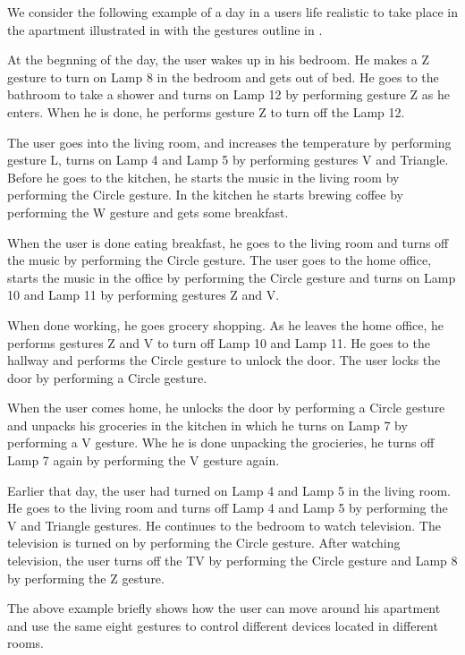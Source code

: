 We consider the following example of a day in a users life realistic to take place in the apartment illustrated in  with the gestures outline in .

\begin{testexample}
At the begnning of the day, the user wakes up in his bedroom. He makes a Z gesture to turn on Lamp 8 in the bedroom and gets out of bed. He goes to the bathroom to take a shower and turns on Lamp 12 by performing gesture Z as he enters. When he is done, he performs gesture Z to turn off the Lamp 12.

The user goes into the living room, and increases the temperature by performing gesture L, turns on Lamp 4 and Lamp 5 by performing gestures V and Triangle. Before he goes to the kitchen, he starts the music in the living room by performing the Circle gesture. In the kitchen he starts brewing coffee by performing the W gesture and gets some breakfast.

When the user is done eating breakfast, he goes to the living room and turns off the music by performing the Circle gesture. The user goes to the home office, starts the music in the office by performing the Circle gesture and turns on Lamp 10 and Lamp 11 by performing gestures Z and V.

When done working, he goes grocery shopping. As he leaves the home office, he performs gestures Z and V to turn off Lamp 10 and Lamp 11. He goes to the hallway and performs the Circle gesture to unlock the door. The user locks the door by performing a Circle gesture.

When the user comes home, he unlocks the door by performing a Circle gesture and unpacks his groceries in the kitchen in which he turns on Lamp 7 by performing a V gesture. Whe he is done unpacking the grocieries, he turns off Lamp 7 again by performing the V gesture again.

Earlier that day, the user had turned on Lamp 4 and Lamp 5 in the living room. He goes to the living room and turns off Lamp 4 and Lamp 5 by performing the V and Triangle gestures. He continues to the bedroom to watch television. The television is turned on by performing the Circle gesture. After watching television, the user turns off the TV by performing the Circle gesture and Lamp 8 by performing the Z gesture.
\end{testexample}

The above example briefly shows how the user can move around his apartment and use the same eight gestures to control different devices located in different rooms.

